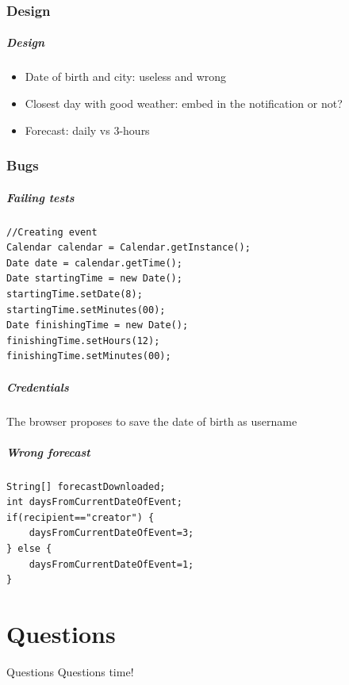 \documentclass[professionalfont]{beamer}
\begin{document}
\section{Design}
\begin{frame}
\frametitle{Design}
\begin{itemize}
\item Date of birth and city: useless and wrong
\item Closest day with good weather: embed in the notification or not?
\item Forecast: daily vs 3-hours
\end{itemize}
\end{frame}

\section{Bugs}

\begin{frame}[fragile]
\frametitle{Failing tests}

\begin{verbatim}
//Creating event
Calendar calendar = Calendar.getInstance();
Date date = calendar.getTime();
Date startingTime = new Date();
startingTime.setDate(8);
startingTime.setMinutes(00);
Date finishingTime = new Date();
finishingTime.setHours(12);
finishingTime.setMinutes(00);
\end{verbatim}
\end{frame}

\begin{frame}
\frametitle{Credentials}
The browser proposes to save the date of birth as username
\end{frame}

\begin{frame}[fragile]
\frametitle{Wrong forecast}
\begin{verbatim}
String[] forecastDownloaded;
int daysFromCurrentDateOfEvent;
if(recipient=="creator") {
    daysFromCurrentDateOfEvent=3;
} else {
    daysFromCurrentDateOfEvent=1; 
}
\end{verbatim}
\end{frame}

\part{Questions}
\label{part:questions}
\begin{frame}{Questions}
\centering\alert{Questions time!}
\end{frame}
\end{document}
